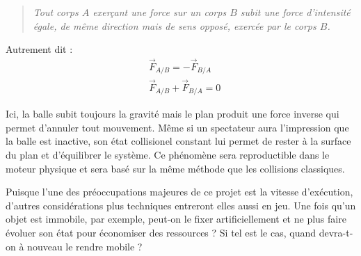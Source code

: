 \begin{quote}
\textit{Tout corps $A$ exerçant une force sur un corps $B$ subit une force
d'intensité égale, de même direction mais de sens opposé, exercée par
le corps $B$.}
\end{quote}

Autrement dit :
\begin{align*}
  &\vec{F}_{A/B} = -\vec{F}_{B/A} \\
  &\vec{F}_{A/B} + \vec{F}_{B/A} = 0
\end{align*}

Ici, la balle subit toujours la gravité mais le plan produit une force
inverse qui permet d'annuler tout mouvement. Même si un spectateur
aura l'impression que la balle est inactive, son état collisionel
constant lui permet de rester à la surface du plan et d'équilibrer le
système. Ce phénomène sera reproductible dans le moteur physique et
sera basé sur la même méthode que les collisions classiques.

Puisque l'une des préoccupations majeures de ce projet est la vitesse
d'exécution, d'autres considérations plus techniques entreront elles
aussi en jeu. Une fois qu'un objet est immobile, par exemple, peut-on
le fixer artificiellement et ne plus faire évoluer son état pour
économiser des ressources ? Si tel est le cas, quand devra-t-on à
nouveau le rendre mobile ?
